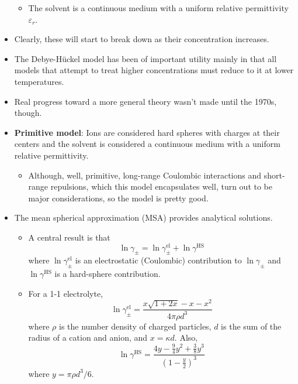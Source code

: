 \documentclass[../notes.tex]{subfiles}
\begin{document}
\begin{itemize}
\begin{itemize}
        \item The solvent is a continuous medium with a uniform relative permittivity $\varepsilon_r$.
    \end{itemize}
    \item Clearly, these will start to break down as their concentration increases.
    \item The Debye-H\"{u}ckel model has been of important utility mainly in that all models that attempt to treat higher concentrations must reduce to it at lower temperatures.
    \item Real progress toward a more general theory wasn't made until the 1970s, though.
    \item \textbf{Primitive model}: Ions are considered hard spheres with charges at their centers and the solvent is considered a continuous medium with a uniform relative permittivity.
    \begin{itemize}
        \item Although, well, primitive, long-range Coulombic interactions and short-range repulsions, which this model encapsulates well, turn out to be major considerations, so the model is pretty good.
    \end{itemize}
    \item The mean spherical approximation (MSA) provides analytical solutions.
    \begin{itemize}
        \item A central result is that
        \begin{equation*}
            \ln\gamma_\pm = \ln\gamma_\pm^\text{el}+\ln\gamma^\text{HS}
        \end{equation*}
        where $\ln\gamma_\pm^\text{el}$ is an electrostatic (Coulombic) contribution to $\ln\gamma_\pm$ and $\ln\gamma^\text{HS}$ is a hard-sphere contribution.
        \item For a 1-1 electrolyte,
        \begin{equation*}
            \ln\gamma_\pm^\text{el} = \frac{x\sqrt{1+2x}-x-x^2}{4\pi\rho d^3}
        \end{equation*}
        where $\rho$ is the number density of charged particles, $d$ is the sum of the radius of a cation and anion, and $x=\kappa d$. Also,
        \begin{equation*}
            \ln\gamma^\text{HS} = \frac{4y-\frac{9}{4}y^2+\frac{3}{8}y^3}{\left( 1-\frac{y}{2} \right)^3}
        \end{equation*}
        where $y=\pi\rho d^3/6$.
    \end{itemize}
\end{itemize}
\end{document}
